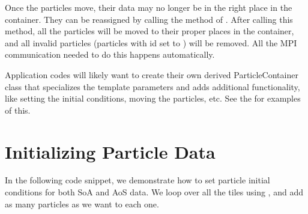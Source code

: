 \documentclass[letterpaper,10pt,english]{sphinxmanual}
\begin{document}
\sphinxAtStartPar
Once the particles move, their data may no longer be in the right place in the
container. They can be reassigned by calling the  method
of .  After calling this method, all the particles will
be moved to their proper places in the container, and all invalid particles
(particles with id set to ) will be removed. All the MPI communication
needed to do this happens automatically.

\sphinxAtStartPar
Application codes will likely want to create their own derived
ParticleContainer class that specializes the template parameters and adds
additional functionality, like setting the initial conditions, moving the
particles, etc. See the  for examples of this.


\section{Initializing Particle Data}
\label{\detokenize{Particle:initializing-particle-data}}\label{\detokenize{Particle:sec-particles-initializing}}
\sphinxAtStartPar
In the following code snippet, we demonstrate how to set particle initial
conditions for both SoA and AoS data. We loop over all the tiles using
, and add as many particles as we want to each one.
\end{document}
